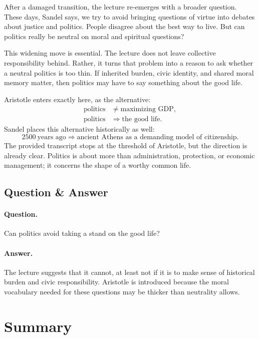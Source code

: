 After a damaged transition, the lecture re-emerges with a broader question. These days, Sandel says, we try to avoid bringing questions of virtue into debates about justice and politics. People disagree about the best way to live. But can politics really be neutral on moral and spiritual questions?

This widening move is essential. The lecture does not leave collective responsibility behind. Rather, it turns that problem into a reason to ask whether a neutral politics is too thin. If inherited burden, civic identity, and shared moral memory matter, then politics may have to say something about the good life.

Aristotle enters exactly here, as the alternative:
\begin{align}
\text{politics}
&\neq
\text{maximizing GDP},\\
\text{politics}
&\Longrightarrow
\text{the good life}.
\end{align}
Sandel places this alternative historically as well:
\begin{equation}
2500\ \text{years ago}
\Longrightarrow
\text{ancient Athens as a demanding model of citizenship}.
\end{equation}
The provided transcript stops at the threshold of Aristotle, but the direction is already clear. Politics is about more than administration, protection, or economic management; it concerns the shape of a worthy common life.

\subsection{Question \& Answer}

\paragraph{Question.} Can politics avoid taking a stand on the good life?

\paragraph{Answer.} The lecture suggests that it cannot, at least not if it is to make sense of historical burden and civic responsibility. Aristotle is introduced because the moral vocabulary needed for these questions may be thicker than neutrality allows.

\section{Summary}

